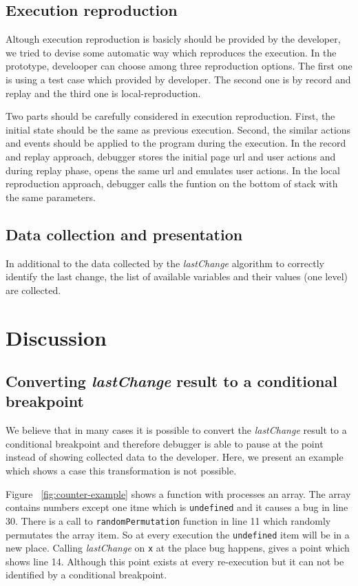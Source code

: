 \documentclass[preprint]{sigplanconf}
\begin{document}
  
\subsection{Execution reproduction}
Altough execution reproduction is basicly should be provided by the developer, we tried to devise some automatic way which reproduces the execution. In the prototype, develooper can choose among three reproduction options. The first one is using a test case which provided by developer. The second one is by record and replay and the third one is local-reproduction.

Two parts should be carefully considered in execution reproduction. First, the initial state should be the same as previous execution. Second, the similar actions and events should be applied to the program during the execution. In the record and replay approach, debugger stores the initial page url and user actions and during replay phase, opens the same url and emulates user actions. 
In the local reproduction approach, debugger calls the funtion on the bottom of stack with the same parameters.

\subsection{Data collection and presentation}
In additional to the data collected by the \textit{lastChange} algorithm to correctly identify the last change, the list of available variables and their values (one level) are collected.


\section{Discussion}
\subsection{Converting \textit{lastChange} result to a conditional breakpoint}
We believe that in many cases it is possible to convert the \textit{lastChange} result to a conditional breakpoint and therefore debugger is able to pause at the point
 instead of showing collected data to the developer. Here, we present an example which shows a case this transformation is not possible.

Figure ~\ref{fig:counter-example} shows a function with processes an array. The array contains numbers except one itme which is \texttt{undefined} and it causes a bug in line 30. There is a call to \texttt{randomPermutation} function in line 11 which randomly permutates the array item. So at every execution the \texttt{undefined} item will be in a new place. Calling \textit{lastChange} on \texttt{x} at the place bug happens, gives a point which shows line 14. Although this point exists at every re-execution but it can not be identified by a conditional breakpoint. 
\end{document}
